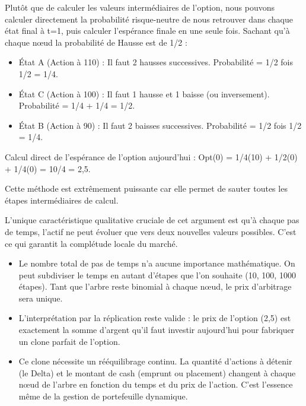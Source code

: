 \begin{examplebox}
Plutôt que de calculer les valeurs intermédiaires de l'option, nous pouvons calculer directement la probabilité risque-neutre de nous retrouver dans chaque état final à t=1, puis calculer l'espérance finale en une seule fois.
Sachant qu'à chaque nœud la probabilité de Hausse est de 1/2 :

\begin{itemize}[label=$\cdot$]
    \item État A (Action à 110) : Il faut 2 hausses successives. Probabilité = 1/2 fois 1/2 = 1/4.
    \item État C (Action à 100) : Il faut 1 hausse et 1 baisse (ou inversement). Probabilité = 1/4 + 1/4 = 1/2.
    \item État B (Action à 90) : Il faut 2 baisses successives. Probabilité = 1/2 fois 1/2 = 1/4.
\end{itemize}

Calcul direct de l'espérance de l'option aujourd'hui :
Opt(0) = 1/4(10) + 1/2(0) + 1/4(0) = 10/4 = 2,5.

Cette méthode est extrêmement puissante car elle permet de sauter toutes les étapes intermédiaires de calcul.
\end{examplebox}

\begin{theorembox}
L'unique caractéristique qualitative cruciale de cet argument est qu'à chaque pas de temps, l'actif ne peut évoluer que vers deux nouvelles valeurs possibles. C'est ce qui garantit la complétude locale du marché.
\begin{itemize}[label=$\rightarrow$]
    \item Le nombre total de pas de temps n'a aucune importance mathématique. On peut subdiviser le temps en autant d'étapes que l'on souhaite (10, 100, 1000 étapes). Tant que l'arbre reste binomial à chaque nœud, le prix d'arbitrage sera unique.
    \item L'interprétation par la réplication reste valide : le prix de l'option (2,5) est exactement la somme d'argent qu'il faut investir aujourd'hui pour fabriquer un clone parfait de l'option.
    \item Ce clone nécessite un rééquilibrage continu. La quantité d'actions à détenir (le Delta) et le montant de cash (emprunt ou placement) changent à chaque nœud de l'arbre en fonction du temps et du prix de l'action. C'est l'essence même de la gestion de portefeuille dynamique.
\end{itemize}
\end{theorembox}

